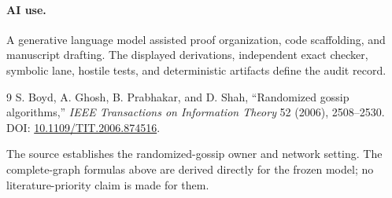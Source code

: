 \documentclass[10pt]{article}
\begin{document}
\paragraph{AI use.}
A generative language model assisted proof organization, code scaffolding,
and manuscript drafting.  The displayed derivations, independent exact
checker, symbolic lane, hostile tests, and deterministic artifacts define
the audit record.
\fi

\begingroup
\small
\begin{thebibliography}{9}
S. Boyd, A. Ghosh, B. Prabhakar, and D. Shah,
``Randomized gossip algorithms,''
\emph{IEEE Transactions on Information Theory} 52 (2006), 2508--2530.
DOI: \href{https://doi.org/10.1109/TIT.2006.874516}%
{10.1109/TIT.2006.874516}.
\end{thebibliography}
The source establishes the randomized-gossip owner and network setting.
The complete-graph formulas above are derived directly for the frozen model;
no literature-priority claim is made for them.
\endgroup
\end{document}

